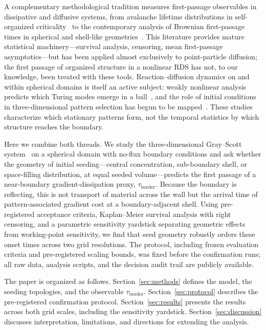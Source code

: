 \documentclass[aps,pre,preprint,superscriptaddress,nofootinbib,floatfix]{revtex4-2}
\newcommand{\tb}{\tau_{\mathrm{border}}}
\begin{document}
A complementary methodological tradition measures first-passage observables in dissipative and diffusive systems, from avalanche lifetime distributions in self-organized criticality~\cite{bak1987} to the contemporary analysis of Brownian first-passage times in spherical and shell-like geometries~\cite{grebenkov2020,grebenkov2022}. This literature provides mature statistical machinery---survival analysis, censoring, mean first-passage asymptotics---but has been applied almost exclusively to point-particle diffusion; the first passage of organized structure in a nonlinear RDS has not, to our knowledge, been treated with these tools. Reaction--diffusion dynamics on and within spherical domains is itself an active subject: weakly nonlinear analysis predicts which Turing modes emerge in a ball~\cite{villarsepulveda2024}, and the role of initial conditions in three-dimensional pattern selection has begun to be mapped~\cite{bentahar2023}. These studies characterize which stationary patterns form, not the temporal statistics by which structure reaches the boundary.

Here we combine both threads. We study the three-dimensional Gray--Scott system~\cite{pearson1993,gray1984} on a spherical domain with no-flux boundary conditions and ask whether the geometry of initial seeding---central concentration, sub-boundary shell, or space-filling distribution, at equal seeded volume---predicts the first passage of a near-boundary gradient-dissipation proxy, $\tb$. Because the boundary is reflecting, this is not transport of material across the wall but the arrival time of pattern-associated gradient cost at a boundary-adjacent shell. Using pre-registered acceptance criteria, Kaplan--Meier survival analysis with right censoring, and a parametric sensitivity yardstick separating geometric effects from working-point sensitivity, we find that seed geometry robustly orders these onset times across two grid resolutions. The protocol, including frozen evaluation criteria and pre-registered scaling bounds, was fixed before the confirmation runs; all raw data, analysis scripts, and the decision audit trail are publicly available.

The paper is organized as follows. Section~\ref{sec:methods} defines the model, the seeding topologies, and the observable $\tb$. Section~\ref{sec:protocol} describes the pre-registered confirmation protocol. Section~\ref{sec:results} presents the results across both grid scales, including the sensitivity yardstick. Section~\ref{sec:discussion} discusses interpretation, limitations, and directions for extending the analysis.
\end{document}

